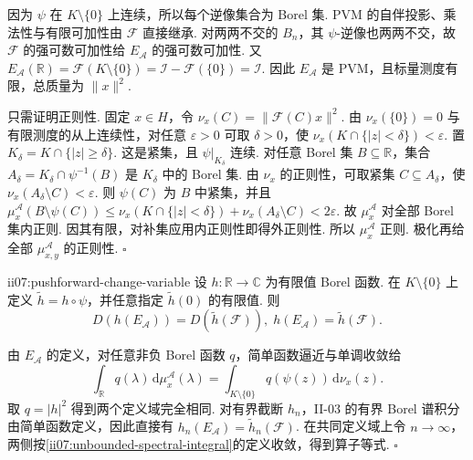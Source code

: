 \begin{FAProof}
因为 \(\displaystyle\psi\) 在 \(\displaystyle K\setminus\{0\}\) 上连续，所以每个逆像集合为 Borel 集. PVM 的自伴投影、乘法性与有限可加性由 \(\displaystyle\mathcal F\) 直接继承. 对两两不交的 \(\displaystyle B_n\)，其 \(\displaystyle\psi\)-逆像也两两不交，故 \(\displaystyle\mathcal F\) 的强可数可加性给 \(\displaystyle E_{\mathcal A}\) 的强可数可加性. 又
\(\displaystyle E_{\mathcal A}(\mathbb R) = \mathcal F(K\setminus\{0\}) = \mathcal I-\mathcal F(\{0\}) = \mathcal I.\)
因此 \(\displaystyle E_{\mathcal A}\) 是 PVM，且标量测度有限，总质量为 \(\displaystyle\|x\|^2\).

只需证明正则性. 固定 \(\displaystyle x\in H\)，令
\(\displaystyle \nu_x(C)=\|\mathcal F(C)x\|^2.\)
由 \(\displaystyle\nu_x(\{0\})=0\) 与有限测度的从上连续性，对任意 \(\displaystyle\varepsilon>0\) 可取 \(\displaystyle\delta>0\)，使
\(\displaystyle \nu_x(K\cap\{|z|<\delta\})<\varepsilon.\)
置
\(\displaystyle K_\delta=K\cap\{|z|\geqslant\delta\}.\)
这是紧集，且 \(\displaystyle\psi|_{K_\delta}\) 连续. 对任意 Borel 集 \(\displaystyle B\subseteq\mathbb R\)，集合
\(\displaystyle A_\delta = K_\delta\cap\psi^{-1}(B)\)
是 \(\displaystyle K_\delta\) 中的 Borel 集. 由 \(\displaystyle\nu_x\) 的正则性，可取紧集 \(\displaystyle C\subseteq A_\delta\)，使 \(\displaystyle\nu_x(A_\delta\setminus C)<\varepsilon\). 则 \(\displaystyle\psi(C)\) 为 \(\displaystyle B\) 中紧集，并且
\(\displaystyle \mu_x^{\mathcal A}(B\setminus\psi(C)) \leqslant \nu_x(K\cap\{|z|<\delta\}) + \nu_x(A_\delta\setminus C) <2\varepsilon.\)
故 \(\displaystyle\mu_x^{\mathcal A}\) 对全部 Borel 集内正则. 因其有限，对补集应用内正则性即得外正则性. 所以 \(\displaystyle\mu_x^{\mathcal A}\) 正则. 极化再给全部 \(\displaystyle\mu_{x,y}^{\mathcal A}\) 的正则性.
\hfill\(\square\)
\end{FAProof}

\begin{FAProposition}[C][推送谱积分的换元规则]{ii07:pushforward-change-variable}
设 \(\displaystyle h:\mathbb R\to\mathbb C\) 为有限值 Borel 函数. 在 \(\displaystyle K\setminus\{0\}\) 上定义 \(\displaystyle\widetilde h=h\circ\psi\)，并任意指定 \(\displaystyle\widetilde h(0)\) 的有限值. 则
\[
D(h(E_{\mathcal A}))=D(\widetilde h(\mathcal F)),
\;
h(E_{\mathcal A})=\widetilde h(\mathcal F).
\]
\end{FAProposition}

\begin{FAProof}
由 \(\displaystyle E_{\mathcal A}\) 的定义，对任意非负 Borel 函数 \(\displaystyle q\)，简单函数逼近与单调收敛给
\[
\int_{\mathbb R}q(\lambda)\,\mathrm{d}\mu_x^{\mathcal A}(\lambda)
=
\int_{K\setminus\{0\}}q(\psi(z))\,\mathrm{d}\nu_x(z).
\]
取 \(\displaystyle q=|h|^2\) 得到两个定义域完全相同. 对有界截断 \(\displaystyle h_n\)，II-03 的有界 Borel 谱积分由简单函数定义，因此直接有 \(\displaystyle h_n(E_{\mathcal A})=\widetilde h_n(\mathcal F)\). 在共同定义域上令 \(\displaystyle n\to\infty\)，两侧按\autoref{ii07:unbounded-spectral-integral}的定义收敛，得到算子等式.
\hfill\(\square\)
\end{FAProof}

